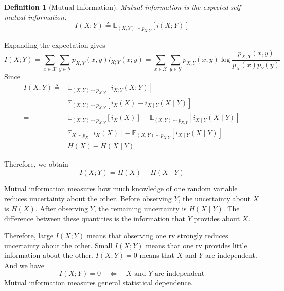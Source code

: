\documentclass[11pt]{report}
\theoremstyle{lecturedefinition}
\newtheorem{definition}{Definition}
\theoremstyle{lectureremark}
\begin{document}
\begin{definition}[Mutual Information]
Mutual information is the expected self mutual information:
\begin{equation*}
    I(X;Y)\triangleq \mathbb{E}_{(X,Y)\sim p_{X,Y}}[i(X;Y)]
\end{equation*}
\end{definition}
Expanding the expectation gives
\begin{equation*}
    I(X;Y)=\sum_{x\in\mathcal{X}}\sum_{y\in\mathcal{Y}}p_{X,Y}(x,y)i_{X;Y}(x;y)=\sum_{x\in\mathcal{X}}\sum_{y\in\mathcal{Y}}p_{X,Y}(x,y)\log\frac{p_{X,Y}(x,y)}{p_X(x)p_Y(y)}
\end{equation*}
Since
\begin{equation*}
\begin{aligned}
    I(X;Y)\triangleq& \mathbb{E}_{(X,Y)\sim p_{X,Y}}[i_{X;Y}(X;Y)]\\
    =& \mathbb{E}_{(X,Y)\sim p_{X,Y}}[i_X(X)-i_{X\mid Y}(X\mid Y)]\\
    =& \mathbb{E}_{(X,Y)\sim p_{X,Y}}[i_X(X)]-\mathbb{E}_{(X,Y)\sim p_{X,Y}}[i_{X\mid Y}(X\mid Y)]\\
    =&\mathbb{E}_{X\sim p_X}[i_X(X)]-\mathbb{E}_{(X,Y)\sim p_{X,Y}}[i_{X\mid Y}(X\mid Y)]\\
    =& H(X)-H(X\mid Y)
\end{aligned}
\end{equation*}

Therefore, we obtain
\begin{equation}
    I(X;Y)=H(X)-H(X\mid Y)
\end{equation}

Mutual information measures how much knowledge of one random variable reduces uncertainty about the other. Before observing $Y$, the uncertainty about $X$ is $H(X)$. After observing $Y$, the remaining uncertainty is $H(X\mid Y)$. The difference between these quantities is the information that $Y$ provides about $X$.

Therefore, large $I(X;Y)$ means that observing one rv strongly reduces uncertainty about the other. Small $I(X;Y)$ means that one rv provides little information about the other. $I(X;Y)=0$ means that $X$ and $Y$ are independent. And we have
\begin{equation}
    I(X;Y)=0 \quad\Longleftrightarrow\quad X \text{ and }Y \text{ are independent}
\end{equation}
Mutual information measures general statistical dependence.
\end{document}
